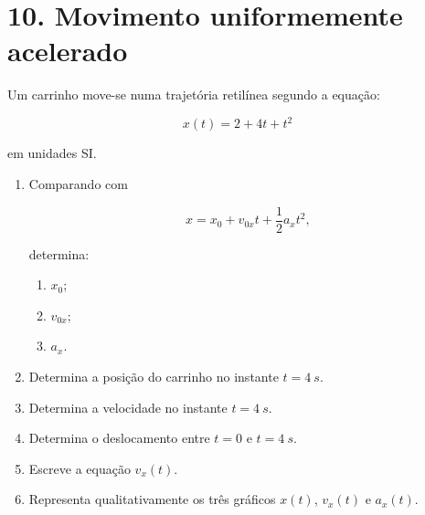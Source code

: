\documentclass[11pt,a4paper]{article}
\newcommand{\resposta}[1][0.8]{
	\vspace{#1cm}
}
\begin{document}
	\section{10. Movimento uniformemente acelerado}
	
	Um carrinho move-se numa trajetória retilínea segundo a equação:
	
	\[
	x(t)=2+4t+t^2
	\]
	
	em unidades SI.
	
	\begin{enumerate}[label=\textbf{\arabic*.},resume]
		
		\item Comparando com
		
		\[
		x=x_0+v_{0x}t+\frac{1}{2}a_xt^2,
		\]
		
		determina:
		
		\begin{enumerate}[label=\alph*)]
			
			\item $x_0$;
			
			\item $v_{0x}$;
			
			\item $a_x$.
			
		\end{enumerate}
		
		\resposta[1.2]
		
		\item Determina a posição do carrinho no instante $t=\SI{4}{s}$.
		
		\resposta[0.9]
		
		\item Determina a velocidade no instante $t=\SI{4}{s}$.
		
		\resposta[1.0]
		
		\item Determina o deslocamento entre $t=0$ e $t=\SI{4}{s}$.
		
		\resposta[1.0]
		
		\item Escreve a equação $v_x(t)$.
		
		\resposta[0.8]
		
		\item Representa qualitativamente os três gráficos $x(t)$, $v_x(t)$ e
		$a_x(t)$.
		
		\begin{center}
			

\end{center}
\end{enumerate}
\end{document}
